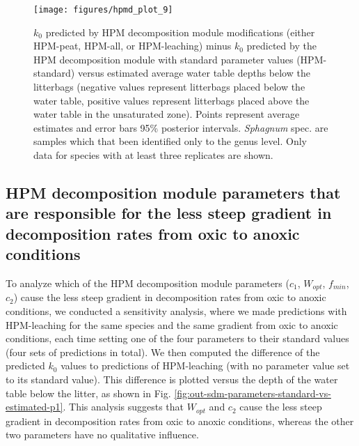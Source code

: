 \documentclass[esd, manuscript]{copernicus}
\begin{document}
\begin{figure}[H]

{\centering \texttt{[image: figures/hpmd\_plot\_9]} 

}

\caption{\(k_0\) predicted by HPM decomposition module modifications (either HPM-peat, HPM-all, or HPM-leaching) minus \(k_0\) predicted by the HPM decomposition module with standard parameter values (HPM-standard) versus estimated average water table depths below the litterbags (negative values represent litterbags placed below the water table, positive values represent litterbags placed above the water table in the unsaturated zone). Points represent average estimates and error bars 95\% posterior intervals. \emph{Sphagnum} spec. are samples which that been identified only to the genus level. Only data for species with at least three replicates are shown.}\label{fig:out-p-hpmd-plot-9}
\end{figure}

\subsection{HPM decomposition module parameters that are responsible for the less steep gradient in decomposition rates from oxic to anoxic conditions}

To analyze which of the HPM decomposition module parameters (\(c_1\), \(W_{opt}\), \(f_{min}\), \(c_2\)) cause the less steep gradient in decomposition rates from oxic to anoxic conditions, we conducted a sensitivity analysis, where we made predictions with HPM-leaching for the same species and the same gradient from oxic to anoxic conditions, each time setting one of the four parameters to their standard values (four sets of predictions in total). We then computed the difference of the predicted \(k_0\) values to predictions of HPM-leaching (with no parameter value set to its standard value). This difference is plotted versus the depth of the water table below the litter, as shown in Fig. \ref{fig:out-sdm-parameters-standard-vs-estimated-p1}. This analysis suggests that \(W_{opt}\) and \(c_2\) cause the less steep gradient in decomposition rates from oxic to anoxic conditions, whereas the other two parameters have no qualitative influence.
\end{document}

